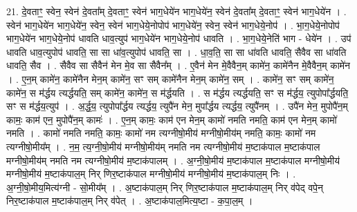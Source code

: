 \documentclass[17pt]{extarticle}
\begin{document}
21. दे॒वताꣳ॒॒ स्वेन॒ स्वेन॑ दे॒वता᳚म् दे॒वताꣳ॒॒ स्वेन॑ भाग॒धेये॑न भाग॒धेये॑न॒ स्वेन॑ दे॒वता᳚म् दे॒वताꣳ॒॒ स्वेन॑ भाग॒धेये॑न । . स्वेन॑ भाग॒धेये॑न भाग॒धेये॑न॒ स्वेन॒ स्वेन॑ भाग॒धेये॒नोपोप॑ भाग॒धेये॑न॒ स्वेन॒ स्वेन॑ भाग॒धेये॒नोप॑ । . भा॒ग॒धेये॒नोपोप॑ भाग॒धेये॑न भाग॒धेये॒नोप॑ धावति धाव॒त्युप॑ भाग॒धेये॑न भाग॒धेये॒नोप॑ धावति । . भा॒ग॒धेये॒नेति॑ भाग - धेये॑न । . उप॑ धावति धाव॒त्युपोप॑ धावति॒ सा सा धा॑व॒त्युपोप॑ धावति॒ सा । . धा॒व॒ति॒ सा सा धा॑वति धावति॒ सैवैव सा धा॑वति धावति॒ सैव । . सैवैव सा सैवैन॑ मेन मे॒व सा सैवैन᳚म् । . ए॒वैन॑ मेन मे॒वैवैन॒म् कामे॑न॒ कामे॑नैन मे॒वैवैन॒म् कामे॑न । . ए॒न॒म् कामे॑न॒ कामे॑नैन मेन॒म् कामे॑न॒ सꣳ सम् कामे॑नैन मेन॒म् कामे॑न॒ सम् । . कामे॑न॒ सꣳ सम् कामे॑न॒ कामे॑न॒ स म॑र्द्धय त्यर्द्धयति॒ सम् कामे॑न॒ कामे॑न॒ स म॑र्द्धयति । . स म॑र्द्धय त्यर्द्धयति॒ सꣳ स म॑र्द्धय॒ त्युपोपा᳚र्द्धयति॒ सꣳ स म॑र्द्धय॒त्युप॑ । . अ॒र्द्ध॒य॒ त्युपोपा᳚र्द्धय त्यर्द्धय॒ त्युपै॑न मेन॒ मुपा᳚र्द्धय त्यर्द्धय॒ त्युपै॑नम् । . उपै॑न मेन॒ मुपोपै॑न॒म् कामः॒ काम॑ एन॒ मुपोपै॑न॒म् कामः॑ । . ए॒न॒म् कामः॒ काम॑ एन मेन॒म् कामो॑ नमति नमति॒ काम॑ एन मेन॒म् कामो॑ नमति । . कामो॑ नमति नमति॒ कामः॒ कामो॑ नम त्यग्नीषो॒मीय॑ मग्नीषो॒मीय॑म् नमति॒ कामः॒ कामो॑ नम त्यग्नीषो॒मीय᳚म् । . न॒म॒ त्य॒ग्नी॒षो॒मीय॑ मग्नीषो॒मीय॑म् नमति नम त्यग्नीषो॒मीय॑ म॒ष्टाक॑पाल म॒ष्टाक॑पाल मग्नीषो॒मीय॑म् नमति नम त्यग्नीषो॒मीय॑ म॒ष्टाक॑पालम् । . अ॒ग्नी॒षो॒मीय॑ म॒ष्टाक॑पाल म॒ष्टाक॑पाल मग्नीषो॒मीय॑ मग्नीषो॒मीय॑ म॒ष्टाक॑पाल॒म् निर् णिर॒ष्टाक॑पाल मग्नीषो॒मीय॑ मग्नीषो॒मीय॑ म॒ष्टाक॑पाल॒म् निः । . अ॒ग्नी॒षो॒मीय॒मित्य॑ग्नी - सो॒मीय᳚म् । . अ॒ष्टाक॑पाल॒म् निर् णिर॒ष्टाक॑पाल म॒ष्टाक॑पाल॒म् निर् व॑पेद् वपे॒न् निर॒ष्टाक॑पाल म॒ष्टाक॑पाल॒म् निर् व॑पेत् । . अ॒ष्टाक॑पाल॒मित्य॒ष्टा - क॒पा॒ल॒म् । \newline
\end{document}
